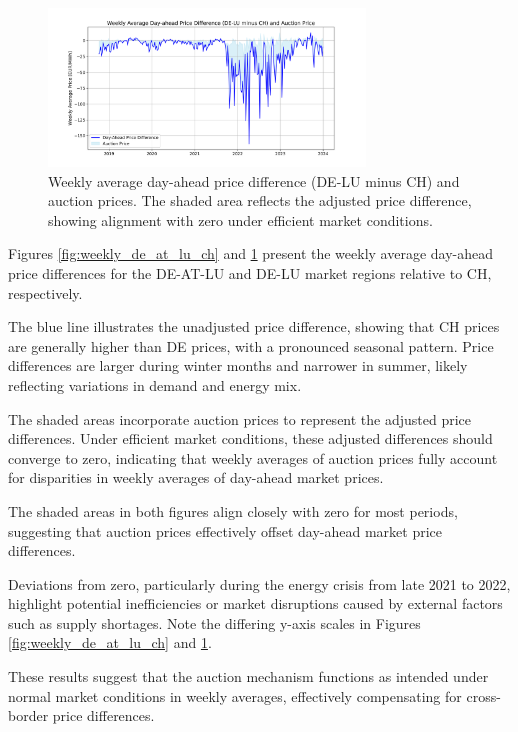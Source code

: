 \documentclass[12pt]{article}
\begin{document}
\begin{figure}[ht]
    \centering
    \includegraphics[width=0.75\textwidth]{figures/weekly_average_day_ahead_price_diff_de-lu_ch.png}
    \caption{Weekly average day-ahead price difference (DE-LU minus CH) and auction prices. The shaded area reflects the adjusted price difference, showing alignment with zero under efficient market conditions.}
    \label{fig:weekly_de_lu_ch}
\end{figure}

\noindent
Figures \ref{fig:weekly_de_at_lu_ch} and \ref{fig:weekly_de_lu_ch} present the weekly average day-ahead price differences for the DE-AT-LU and DE-LU market regions relative to CH, respectively. 

The blue line illustrates the unadjusted price difference, showing that CH prices are generally higher than DE prices, with a pronounced seasonal pattern. Price differences are larger during winter months and narrower in summer, likely reflecting variations in demand and energy mix.

The shaded areas incorporate auction prices to represent the adjusted price differences. Under efficient market conditions, these adjusted differences should converge to zero, indicating that weekly averages of auction prices fully account for disparities in weekly averages of day-ahead market prices.

The shaded areas in both figures align closely with zero for most periods, suggesting that auction prices effectively offset day-ahead market price differences.

Deviations from zero, particularly during the energy crisis from late 2021 to 2022, highlight potential inefficiencies or market disruptions caused by external factors such as supply shortages. Note the differing y-axis scales in Figures \ref{fig:weekly_de_at_lu_ch} and \ref{fig:weekly_de_lu_ch}.

\noindent
These results suggest that the auction mechanism functions as intended under normal market conditions in weekly averages, effectively compensating for cross-border price differences.
\end{document}
